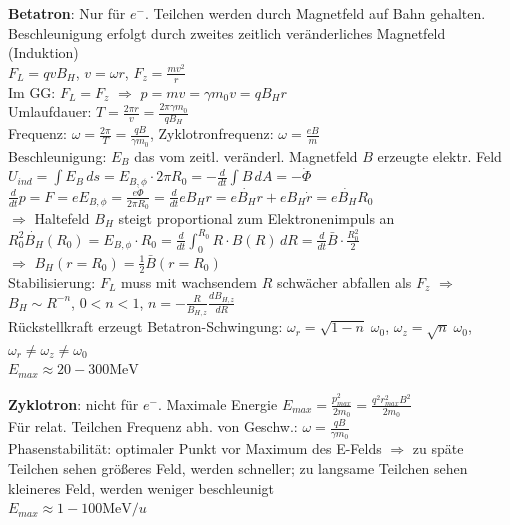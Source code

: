 \documentclass[10pt,twoside,a4paper]{article}
\begin{document}
\begin{multicols*}{3}
\textbf{Betatron}: Nur für $e^-$. Teilchen werden durch Magnetfeld auf Bahn gehalten. Beschleunigung erfolgt durch zweites zeitlich veränderliches Magnetfeld (Induktion) \\
$F_L = q v B_H$, $v = \omega r$, $F_z = \frac{m v^2}{r}$ \\
Im GG: $F_L = F_z$ $\Rightarrow$ $p = m v = \gamma m_0 v = q B_H r$ \\
Umlaufdauer: $T = \frac{2 \pi r}{v} = \frac{2 \pi \gamma m_0}{q B_H}$ \\
Frequenz: $\omega = \frac{2 \pi}{T} = \frac{q B}{\gamma m_0}$, Zyklotronfrequenz: $\omega = \frac{e B}{m}$ \\
Beschleunigung: $E_B$ das vom zeitl. veränderl. Magnetfeld $B$ erzeugte elektr. Feld \\
$U_{ind} = \int E_B \,ds = E_{B,\phi} \cdot 2 \pi R_0 = - \frac{d}{dt} \int B \,dA = - \dot{\Phi}$ \\
$\frac{d}{dt} p = F = e E_{B,\phi} = \frac{e \dot{\Phi}}{2 \pi R_0} = \frac{d}{dt} e B_H r = e \dot{B_H} r +  e B_H \dot{r} = e \dot{B_H} R_0$ \\
$\Rightarrow$ Haltefeld $B_H$ steigt proportional zum Elektronenimpuls an \\
$R_0^2 \dot{B_H}(R_0) = E_{B,\phi} \cdot R_0 = \frac{d}{dt} \int_{0}^{R_0} R \cdot B(R) \,dR = \frac{d}{dt} \bar{B} \cdot \frac{R_0^2}{2}$ \\
$\Rightarrow$ $B_H(r = R_0) = \frac{1}{2} \bar{B}(r = R_0)$ \\
Stabilisierung: $F_L$ muss mit wachsendem $R$ schwächer abfallen als $F_z$ $\Rightarrow$ $B_H \sim R^{-n}$, $0 < n < 1$, $n = - \frac{R}{B_{H,z}} \frac{dB_{H,z}}{dR}$ \\
Rückstellkraft erzeugt Betatron-Schwingung: $\omega_r = \sqrt{1-n} \; \omega_0$, $\omega_z = \sqrt{n} \; \omega_0$, $\omega_r \neq \omega_z \neq \omega_0$ \\
$E_{max} \approx 20 - 300 \si{\mega\eV}$

\textbf{Zyklotron}: nicht für $e^-$. Maximale Energie $E_{max} = \frac{p^2_{max}}{2 m_0} = \frac{q^2 r^2_{max} B^2}{2 m_0}$ \\
Für relat. Teilchen Frequenz abh. von Geschw.: $\omega = \frac{q B}{\gamma m_0}$ \\
Phasenstabilität: optimaler Punkt vor Maximum des E-Felds $\Rightarrow$ zu späte Teilchen sehen größeres Feld, werden schneller; zu langsame Teilchen sehen kleineres Feld, werden weniger beschleunigt \\
$E_{max} \approx 1 - 100 \si{\mega\eV}/u$


\end{multicols*}
\end{document}
